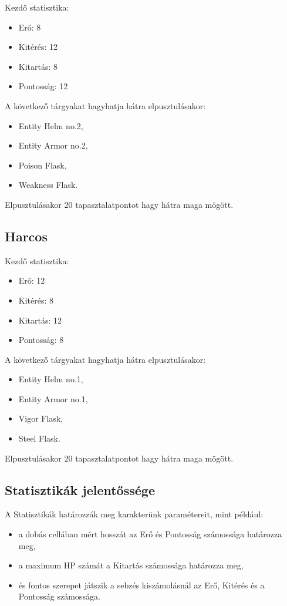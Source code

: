 \noindent Kezdő statisztika:
\begin{itemize}
    \item Erő: 8
    \item Kitérés: 12
    \item Kitartás: 8
    \item Pontosság: 12
\end{itemize}

\noindent A következő tárgyakat hagyhatja hátra elpusztulásakor:

\begin{itemize}
    \item Entity Helm no.2,
    \item Entity Armor no.2,
    \item Poison Flask,
    \item Weakness Flask.
\end{itemize}

\noindent Elpusztulásakor 20 tapasztalatpontot hagy hátra maga mögött.

\subsection{Harcos}

\noindent Kezdő statisztika:
\begin{itemize}
    \item Erő: 12
    \item Kitérés: 8
    \item Kitartás: 12
    \item Pontosság: 8
\end{itemize}

\noindent A következő tárgyakat hagyhatja hátra elpusztulásakor:

\begin{itemize}
    \item Entity Helm no.1,
    \item Entity Armor no.1,
    \item Vigor Flask,
    \item Steel Flask.
\end{itemize}

\noindent Elpusztulásakor 20 tapasztalatpontot hagy hátra maga mögött.


\subsection{Statisztikák jelentőssége}

A Statisztikák határozzák meg karakterünk paramétereit, mint például:
\begin{itemize}
    \item a dobás cellában mért hosszát az Erő és Pontosság számossága határozza meg,
    \item a maximum HP számát a Kitartás számossága határozza meg,
    \item és fontos szerepet játszik a sebzés kiszámolásnál az Erő, Kitérés és a Pontosság számossága.
\end{itemize}

